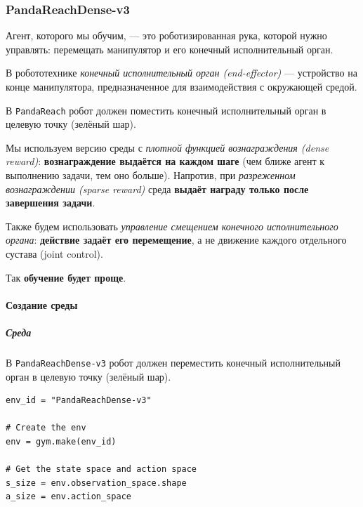 \documentclass[11pt,a4paper]{article}
\begin{document}
\subsubsection{PandaReachDense-v3}\label{pandareachdense-v3}

Агент, которого мы обучим, --- это роботизированная рука, которой нужно управлять: перемещать манипулятор и его конечный исполнительный орган.

В робототехнике \emph{конечный исполнительный орган (end-effector)} --- устройство на конце манипулятора, предназначенное для взаимодействия с окружающей средой.

В \texttt{PandaReach} робот должен поместить конечный исполнительный орган в целевую точку (зелёный шар).

Мы используем версию среды с \emph{плотной функцией вознаграждения (dense reward)}: \textbf{вознаграждение выдаётся на каждом шаге} (чем ближе агент к выполнению задачи, тем оно больше). Напротив, при \emph{разреженном вознаграждении (sparse reward)} среда \textbf{выдаёт награду только после завершения задачи}.

Также будем использовать \emph{управление смещением конечного исполнительного органа}: \textbf{действие задаёт его перемещение}, а не движение каждого отдельного сустава (joint control).


Так \textbf{обучение будет проще}.

\paragraph{Создание среды}\label{create-the-environment}

\subparagraph{Среда}\label{the-environment}

В \texttt{PandaReachDense-v3} робот должен переместить конечный исполнительный орган в целевую точку (зелёный шар).

\begin{lstlisting}
env_id = "PandaReachDense-v3"

# Create the env
env = gym.make(env_id)

# Get the state space and action space
s_size = env.observation_space.shape
a_size = env.action_space
\end{lstlisting}
\end{document}
